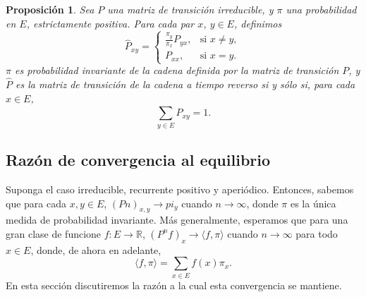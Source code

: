 \documentclass[a4paper]{article}
\newtheorem{prop}{Proposici\'on}
\numberwithin{equation}{subsection}
\numberwithin{definicion}{subsection}
\def\R{\mathbb R}
\begin{document}
\begin{prop}
Sea $P$ una matriz de transición irreducible, y $\pi$ una probabilidad en $E$, estrictamente positiva. Para cada par $x$, $y\in E$, definimos
\[\hat{P}_{xy}= \begin{cases}
                \frac{\pi_y}{\pi_x}P_{yx}, & \text{si }x\neq y,\\
                P_{xx}, & \text{si }x=y.
                \end{cases}\]
$\pi$ es probabilidad invariante de la cadena definida por la matriz de transición $P$, y $\hat{P}$ es la matriz de transición de la cadena a tiempo reverso si y sólo si, para cada $x\in E$,
\[\sum_{y\in E} \hat{P}_{xy} = 1.\]
\end{prop}

\subsection{Razón de convergencia al equilibrio}
Suponga el caso irreducible, recurrente positivo y aperiódico. Entonces, sabemos que para cada $x,y \in E$, $(Pn)_{x,y}\rightarrow pi_y$ cuando $n\rightarrow \infty$, donde $\pi$ es la única medida de probabilidad invariante. Más generalmente, esperamos que para una gran clase de funcione $f:E\rightarrow \R$, $(P^nf)_{x}\rightarrow \langle f,\pi \rangle$ cuando $n\rightarrow \infty$ para todo $x\in E$, donde, de ahora en adelante,
\[\langle f,\pi \rangle = \sum_{x\in E}f(x)\pi_x.\]
En esta sección discutiremos la razón a la cual esta convergencia se mantiene.
\end{document}
